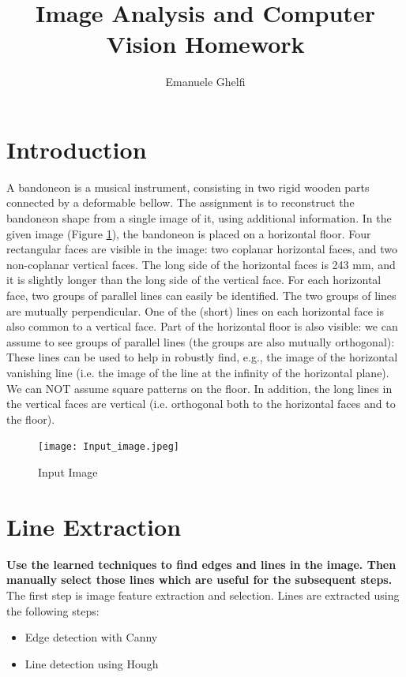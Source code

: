 \documentclass[11pt, oneside]{article}   	%
\title{Image Analysis and Computer Vision Homework}
\author{Emanuele Ghelfi}
\affil{Politecnico di Milano \\ A.Y. 2017/2018}
\begin{document}
\maketitle

\pagebreak
\tableofcontents
\pagebreak
\section{Introduction}
A bandoneon is a musical instrument, consisting in two rigid wooden parts connected by a deformable bellow. The assignment is to reconstruct the bandoneon shape from a single image of it, using additional information.
In the given image (Figure \ref{inputimg}), the bandoneon is placed on a horizontal floor. Four rectangular faces are visible in the image: two coplanar horizontal faces, and two non-coplanar vertical faces. The long side of the horizontal faces is 243 mm, and it is slightly longer than the long side of the vertical face.
For each horizontal face, two groups of parallel lines can easily be identified. The two groups of lines are mutually perpendicular. One of the (short) lines on each horizontal face is also common to a vertical face. Part of the horizontal floor is also visible: we can assume to see groups of parallel lines (the groups are also mutually orthogonal): These lines can be used to help in robustly find, e.g., the image of the horizontal vanishing line (i.e. the image of the line at the infinity of the horizontal plane). We can NOT assume square patterns on the floor.
In addition, the long lines in the vertical faces are vertical (i.e. orthogonal both to the horizontal faces and to the floor).
\begin{figure}[!b]
\texttt{[image: Input\_image.jpeg]}
\caption{Input Image}
\label{inputimg}
\end{figure}

\section{Line Extraction}
\textbf{Use the learned techniques to find edges and lines in the image. Then manually select those lines which are useful for the subsequent steps.} \hfill \break
The first step is image feature extraction and selection. 
Lines are extracted using the following steps:
\begin{itemize}
\item Edge detection with Canny
\item Line detection using Hough

\end{itemize}
\end{document}
